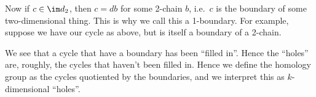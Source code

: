 \documentclass[a4paper]{article}
\begin{document}
Now if $c \in \im d_2$, then $c = db$ for some 2-chain $b$, i.e.\ $c$ is the boundary of some two-dimensional thing. This is why we call this a 1-boundary. For example, suppose we have our cycle as above, but is itself a boundary of a 2-chain.
\begin{center}
\end{center}
We see that a cycle that have a boundary has been ``filled in''. Hence the ``holes'' are, roughly, the cycles that haven't been filled in. Hence we define the homology group as the cycles quotiented by the boundaries, and we interpret this as $k$-dimensional ``holes''.
\end{document}
